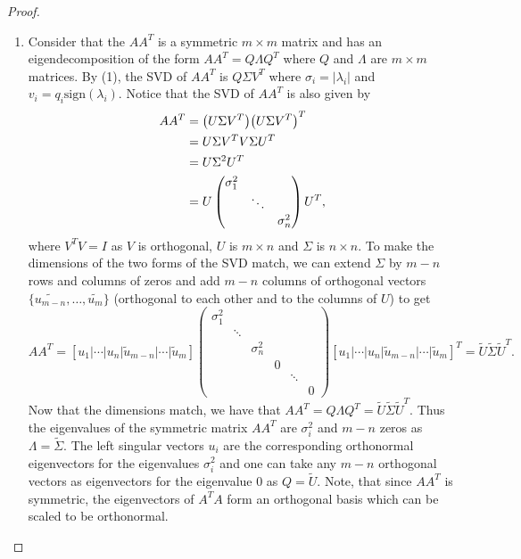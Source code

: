 \documentclass[12pt]{report}
\begin{document}
\begin{problem}
\begin{proof}
\begin{enumerate}
     \item
     Consider that the $AA^T$ is a symmetric $m\times m$ matrix and has an eigendecomposition of the form $AA^T = Q\Lambda Q^T$ where $Q$ and $\Lambda$ are $m \times m$ matrices. By (1), the SVD of $AA^T$ is $Q\Sigma V^T$ where $\sigma_i = |\lambda_i|$ and $v_i = q_i \text{sign}(\lambda_i)$. Notice that the SVD of $AA^T$ is also given by
     \begin{align*}
          AA^T &= {\left(U\Sigma V^T\right)}{\left(U \Sigma V^T\right)}^T\\
               &= U\Sigma V^T V \Sigma U^T\\
               &= U \Sigma^2 U^T\\
               &= U \begin{pmatrix}
                    \sigma_1^2\\
                    &\ddots\\
                    &&\sigma_n^2
               \end{pmatrix} U^T,
     \end{align*}
     where $V^TV = I$ as $V$ is orthogonal, $U$ is $m \times n$ and $\Sigma$ is $n \times n$. To make the dimensions of the two forms of the SVD match, we can extend $\Sigma$ by $m-n$ rows and columns of zeros and add $m-n$ columns of orthogonal vectors $\{\tilde{u_{m-n}},\dots, \tilde{u_m}\}$ (orthogonal to each other and to the columns of $U$) to get
     \[
           AA^T = [u_1 \Big| \cdots \Big| u_n \Big| \tilde{u}_{m-n} \Big| \cdots \Big| \tilde{u}_m]\begin{pmatrix}
               \sigma_1^2\\
               &\ddots\\
               &&\sigma_n^2\\
               &&&0\\
               &&&&\ddots\\
               &&&&&0
           \end{pmatrix}[u_1 \Big| \cdots \Big| u_n \Big| \tilde{u}_{m-n} \Big| \cdots \Big| \tilde{u}_m]^T = \tilde{U}\tilde{\Sigma}\tilde{U}^T.
     \]
     Now that the dimensions match, we have that $AA^T = Q\Lambda Q^T = \tilde{U}\tilde{\Sigma}\tilde{U}^T$. Thus the eigenvalues of the symmetric matrix $AA^T$ are $\sigma_i^2$ and $m-n$ zeros as $\Lambda = \tilde{\Sigma}$. The left singular vectors $u_i$ are the corresponding orthonormal eigenvectors for the eigenvalues $\sigma_i^2$ and one can take any $m - n$ orthogonal vectors as eigenvectors for the eigenvalue $0$ as $Q = \tilde{U}$. Note, that since $AA^T$ is symmetric, the eigenvectors of $A^TA$ form an orthogonal basis which can be scaled to be orthonormal. 


\end{enumerate}
\end{proof}
\end{problem}
\end{document}
